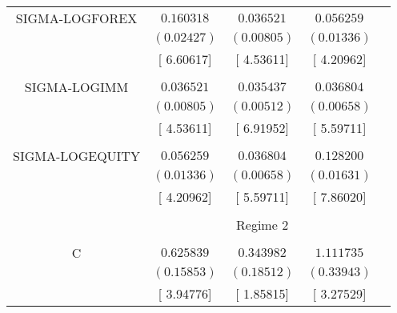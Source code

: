 \begin{tabular}{lrrrr}
\multicolumn{1}{c}{SIGMA-LOGFOREX}&\multicolumn{1}{c}{$0.160318$}&\multicolumn{1}{c}{$0.036521$}&\multicolumn{1}{c}{$0.056259$}&\multicolumn{1}{c}{}\\
\multicolumn{1}{c}{}&\multicolumn{1}{c}{$(0.02427)$}&\multicolumn{1}{c}{$(0.00805)$}&\multicolumn{1}{c}{$(0.01336)$}&\multicolumn{1}{c}{}\\
\multicolumn{1}{c}{}&\multicolumn{1}{c}{[ 6.60617]}&\multicolumn{1}{c}{[ 4.53611]}&\multicolumn{1}{c}{[ 4.20962]}&\multicolumn{1}{c}{}\\
\multicolumn{1}{c}{}&\multicolumn{1}{c}{}&\multicolumn{1}{c}{}&\multicolumn{1}{c}{}&\multicolumn{1}{c}{}\\
\multicolumn{1}{c}{SIGMA-LOGIMM}&\multicolumn{1}{c}{$0.036521$}&\multicolumn{1}{c}{$0.035437$}&\multicolumn{1}{c}{$0.036804$}&\multicolumn{1}{c}{}\\
\multicolumn{1}{c}{}&\multicolumn{1}{c}{$(0.00805)$}&\multicolumn{1}{c}{$(0.00512)$}&\multicolumn{1}{c}{$(0.00658)$}&\multicolumn{1}{c}{}\\
\multicolumn{1}{c}{}&\multicolumn{1}{c}{[ 4.53611]}&\multicolumn{1}{c}{[ 6.91952]}&\multicolumn{1}{c}{[ 5.59711]}&\multicolumn{1}{c}{}\\
\multicolumn{1}{c}{}&\multicolumn{1}{c}{}&\multicolumn{1}{c}{}&\multicolumn{1}{c}{}&\multicolumn{1}{c}{}\\
\multicolumn{1}{c}{SIGMA-LOGEQUITY}&\multicolumn{1}{c}{$0.056259$}&\multicolumn{1}{c}{$0.036804$}&\multicolumn{1}{c}{$0.128200$}&\multicolumn{1}{c}{}\\
\multicolumn{1}{c}{}&\multicolumn{1}{c}{$(0.01336)$}&\multicolumn{1}{c}{$(0.00658)$}&\multicolumn{1}{c}{$(0.01631)$}&\multicolumn{1}{c}{}\\
\multicolumn{1}{c}{}&\multicolumn{1}{c}{[ 4.20962]}&\multicolumn{1}{c}{[ 5.59711]}&\multicolumn{1}{c}{[ 7.86020]}&\multicolumn{1}{c}{}\\
[4.5pt] \hline \\ [-4.5pt]
\multicolumn{1}{c}{}&\multicolumn{3}{c}{Regime 2}&\multicolumn{1}{c}{}\\
[4.5pt] \hline \\ [-4.5pt]
\multicolumn{1}{c}{C}&\multicolumn{1}{c}{$0.625839$}&\multicolumn{1}{c}{$0.343982$}&\multicolumn{1}{c}{$1.111735$}&\multicolumn{1}{c}{}\\
\multicolumn{1}{c}{}&\multicolumn{1}{c}{$(0.15853)$}&\multicolumn{1}{c}{$(0.18512)$}&\multicolumn{1}{c}{$(0.33943)$}&\multicolumn{1}{c}{}\\
\multicolumn{1}{c}{}&\multicolumn{1}{c}{[ 3.94776]}&\multicolumn{1}{c}{[ 1.85815]}&\multicolumn{1}{c}{[ 3.27529]}&\multicolumn{1}{c}{}\\

\end{tabular}
